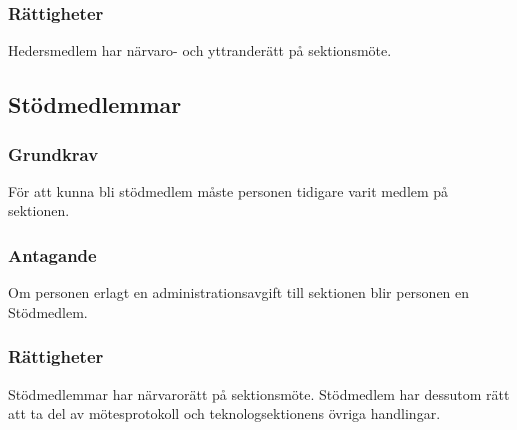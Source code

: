 \subsubsection{Rättigheter}
Hedersmedlem har närvaro- och yttranderätt på sektionsmöte.

\subsection{Stödmedlemmar}
\subsubsection{Grundkrav}
För att kunna bli stödmedlem måste personen tidigare varit medlem på sektionen.
\subsubsection{Antagande}
Om personen erlagt en administrationsavgift till sektionen blir personen en Stödmedlem.
\subsubsection{Rättigheter}
Stödmedlemmar har närvarorätt på sektionsmöte. Stödmedlem har dessutom rätt att ta del av mötesprotokoll och teknologsektionens övriga handlingar.
